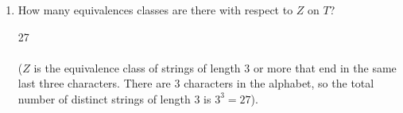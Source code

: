 \documentclass[]{exam}
\begin{document}
\begin{questions}
\begin{enumerate}[label=\alph*)]
\item How many equivalences classes are there with respect to $Z$ on $T$?
\begin{solution}
27
\\~\\
($Z$ is the equivalence class of strings of length $3$ or more that end in
the same last three characters. There are $3$ characters in the alphabet,
so the total number of distinct strings of length $3$ is $3^3 = 27$).
\end{solution}
\end{enumerate}


\end{questions}
\end{document}
